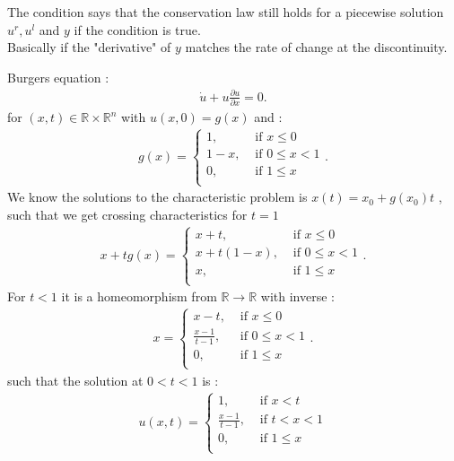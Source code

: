 \begin{corollary}
  The condition says that the conservation law still holds for a piecewise solution $u^{r},u^{l}  $  and $y$ if the condition is true. \\[1ex]
  Basically if the "derivative" of $y$ matches the rate of change at the discontinuity.
\end{corollary}
\begin{example}
 Burgers equation : 
 \begin{align*}
   \dot{u} + u \frac{\partial u}{\partial x}  = 0
 .\end{align*}
 for $(x,t) \in  \mathbb{R} \times  \mathbb{R}^{n} $ with $u(x,0) = g(x)$ and : 
 \begin{align*}
  g(x) = \begin{cases}
    1, &\text{ if } x\le 0\\
    1-x, &\text{ if } 0 \le x < 1\\
    0, &\text{ if } 1\le x\\ 
  \end{cases}
 .\end{align*}
 We know the solutions to the characteristic problem is $x(t)=x_0+g(x_0)t$ , such that we get crossing characteristics for $t=1$
 \begin{align*}
  x + tg(x) = \begin{cases}
    x+t, &\text{ if } x\le 0\\
    x+t(1-x), &\text{ if } 0 \le x < 1\\
    x, &\text{ if } 1\le x\\ 
  \end{cases}
 .\end{align*}
 For $t<1$ it is a  homeomorphism from $\mathbb{R} \to  \mathbb{R}$ with inverse : 
 \begin{align*} 
  x = \begin{cases}
    x-t, &\text{ if } x\le 0\\
    \frac{x-1}{t-1}, &\text{ if } 0 \le x < 1\\
    0, &\text{ if } 1\le x\\ 
  \end{cases}
 .\end{align*}
 such that the solution at $0<t<1$ is  : 
 \begin{align*}
  u(x,t) = \begin{cases}
    1, &\text{ if }x<t\\
    \frac{x-1}{t-1}, &\text{ if }t<x<1\\
    0, &\text{ if }1\le x\\

\end{cases}
\end{align*}
\end{example}
